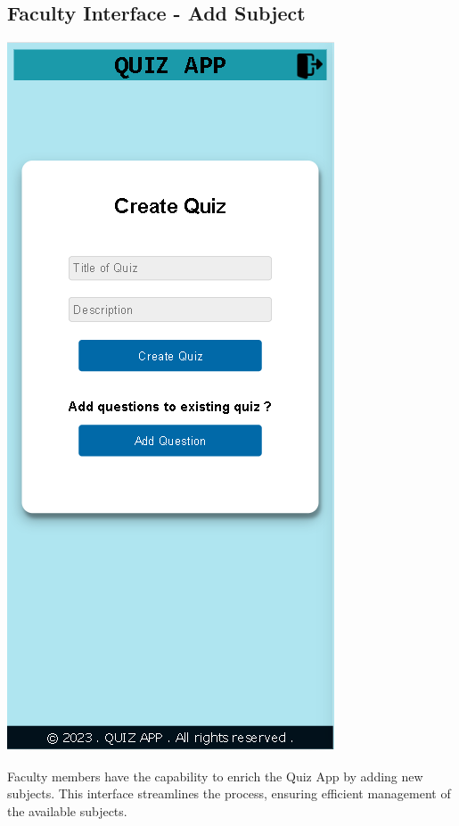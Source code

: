 \subsection{Faculty Interface - Add Subject}
\begin{center}
    \includegraphics[scale=0.4]{project/images/ADD SUBJECT.png}
\end{center}

Faculty members have the capability to enrich the Quiz App by adding new subjects. This interface streamlines the process, ensuring efficient management of the available subjects.

